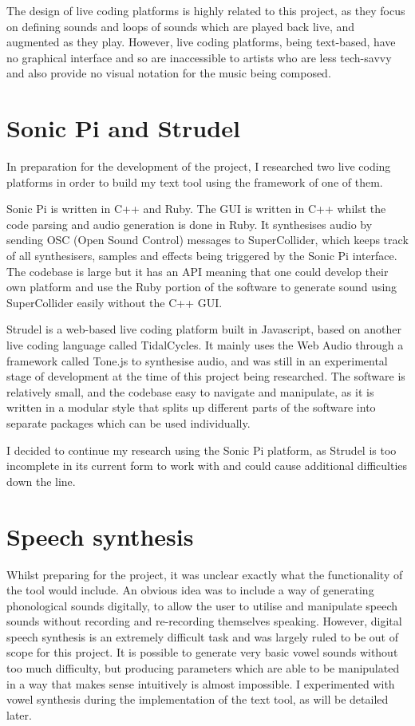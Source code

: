 \documentclass[12pt,a4paper,oneside,openright]{report}
\begin{document}
The design of live coding platforms is highly related to this project, as they focus on defining sounds and loops of sounds which are played back live, and augmented as they play. However, live coding platforms, being text-based, have no graphical interface and so are inaccessible to artists who are less tech-savvy and also provide no visual notation for the music being composed.

\section{Sonic Pi and Strudel}
In preparation for the development of the project, I researched two live coding platforms in order to build my text tool using the framework of one of them.

Sonic Pi is written in C++ and Ruby. The GUI is written in C++ whilst the code parsing and audio generation is done in Ruby. It synthesises audio by sending OSC (Open Sound Control) messages to SuperCollider, which keeps track of all synthesisers, samples and effects being triggered by the Sonic Pi interface. The codebase is large but it has an API meaning that one could develop their own platform and use the Ruby portion of the software to generate sound using SuperCollider easily without the C++ GUI.

Strudel is a web-based live coding platform built in Javascript, based on another live coding language called TidalCycles. It mainly uses the Web Audio through a framework called Tone.js to synthesise audio, and was still in an experimental stage of development at the time of this project being researched. The software is relatively small, and the codebase easy to navigate and manipulate, as it is written in a modular style that splits up different parts of the software into separate packages which can be used individually.

I decided to continue my research using the Sonic Pi platform, as Strudel is too incomplete in its current form to work with and could cause additional difficulties down the line.

\section{Speech synthesis}
Whilst preparing for the project, it was unclear exactly what the functionality of the tool would include. An obvious idea was to include a way of generating phonological sounds digitally, to allow the user to utilise and manipulate speech sounds without recording and re-recording themselves speaking. However, digital speech synthesis is an extremely difficult task and was largely ruled to be out of scope for this project. It is possible to generate very basic vowel sounds without too much difficulty, but producing parameters which are able to be manipulated in a way that makes sense intuitively is almost impossible. I experimented with vowel synthesis during the implementation of the text tool, as will be detailed later.
\end{document}
